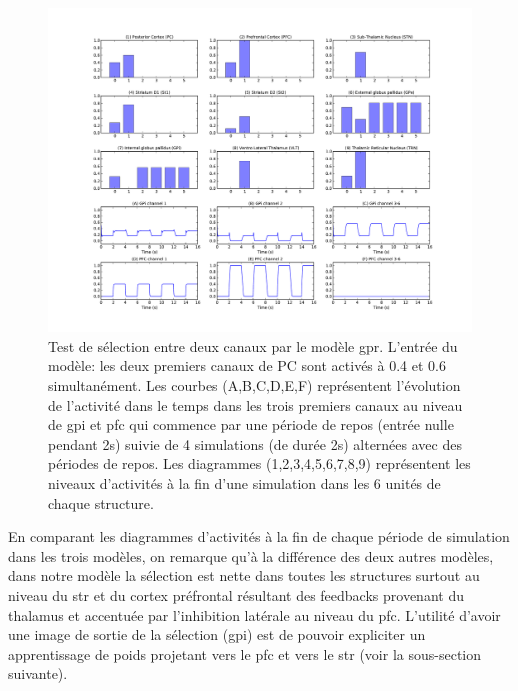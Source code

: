 \begin{figure}
\begin{center}
\includegraphics[width=\textwidth]{figures/ch4_10_gurney_04}
\caption{ Test de sélection entre deux canaux par le modèle \protect\gls{gpr}. L'entrée du modèle: les deux premiers canaux de PC sont activés à 0.4 et 0.6 simultanément. Les courbes (A,B,C,D,E,F) représentent l'évolution de l'activité dans le temps dans les trois premiers canaux au niveau de \protect\gls{gpi} et \protect\gls{pfc} qui commence par une période de repos (entrée nulle pendant 2s) suivie de 4 simulations (de durée 2s) alternées avec des périodes de repos. Les diagrammes (1,2,3,4,5,6,7,8,9) représentent les niveaux d'activités à la fin d'une simulation dans les 6 unités de chaque structure.}
\label{GPR4}
\end{center}
\end{figure}

En comparant les diagrammes d'activités à la fin de chaque période de simulation dans les trois modèles, on remarque qu'à la différence des deux autres modèles, dans notre modèle la sélection est nette dans toutes les structures surtout au niveau du \gls{str} et du cortex préfrontal résultant des feedbacks provenant du thalamus et accentuée par l'inhibition latérale au niveau du \gls{pfc}. L'utilité d'avoir une image de sortie de la sélection (\gls{gpi}) est de pouvoir expliciter un apprentissage de poids projetant vers le \gls{pfc} et vers le \gls{str} (voir la sous-section suivante).\\

